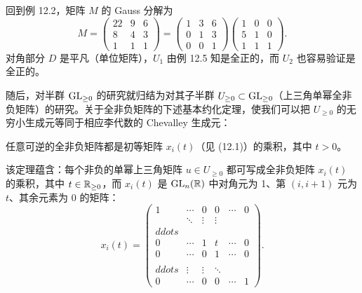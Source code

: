 \begin{example}[12.7]
回到例 12.2，矩阵 $M$ 的 Gauss 分解为
\[
M=\begin{pmatrix} 22 & 9 & 6\\ 8 & 4 & 3\\ 1 & 1 & 1\end{pmatrix}
=\begin{pmatrix} 1 & 3 & 6\\ 0 & 1 & 3\\ 0 & 0 & 1\end{pmatrix}
\begin{pmatrix} 1 & 0 & 0\\ 5 & 1 & 0\\ 1 & 1 & 1\end{pmatrix}.
\]
对角部分 $D$ 是平凡（单位矩阵），$U_1$ 由例 12.5 知是全正的，而 $U_2$ 也容易验证是全正的。
\end{example}


随后，对半群 $\operatorname{GL}_{\ge 0}$ 的研究就归结为对其子半群 $U_{\ge 0}\subset\operatorname{GL}_{\ge 0}$（上三角单幂全非负矩阵）的研究。关于全非负矩阵的下述基本约化定理，使我们可以把 $U_{\ge 0}$ 的无穷小生成元等同于相应李代数的 Chevalley 生成元：

\begin{theorem}
任意可逆的全非负矩阵都是初等矩阵 $x_i(t)$（见 (12.1)）的乘积，其中 $t>0$。
\end{theorem}

该定理蕴含：每个非负的单幂上三角矩阵 $u\in U_{\ge 0}$ 都可写成全非负矩阵 $x_i(t)$ 的乘积，其中 $t\in\mathbb{R}_{\ge 0}$，而 $x_i(t)$ 是 $\operatorname{GL}_n(\mathbb{R})$ 中对角元为 1、第 $(i,i+1)$ 元为 $t$、其余元素为 0 的矩阵：
\begin{equation}
x_i(t)=
\begin{pmatrix}
1 & \cdots & 0 & 0 & \cdots & 0\\
 & \ddots & \vdots & \vdots & \\ddots & \\
0 & \cdots & 1 & t & \cdots & 0\\
0 & \cdots & 0 & 1 & \cdots & 0\\
 & \\ddots & \vdots & \vdots & \ddots & \\
0 & \cdots & 0 & 0 & \cdots & 1
\end{pmatrix}.
\tag{12.1}
\end{equation}

